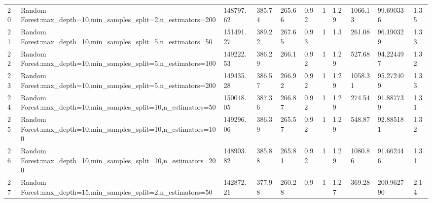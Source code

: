 \begin{longtable}{C{0.8cm} L{2cm} C{1.15cm} C{1.15cm} C{1.15cm} C{1.15cm} C{0.85cm} C{1.25cm} C{1.2cm} C{1.5cm} C{1.0cm}}
20 & Random Forest:\newline max\_depth=10,\newline min\_samples\_split=2,\newline n\_estimators=200 & 148797.62 & 385.74 & 265.66 & 0.92 & 1 & 1.29 & 1066.13 & 99.690336 & 1.35 \\
21 & Random Forest:\newline max\_depth=10,\newline min\_samples\_split=5,\newline n\_estimators=50 & 151491.27 & 389.22 & 267.65 & 0.93 & 1 & 1.3 & 261.08 & 96.190329 & 1.33 \\
22 & Random Forest:\newline max\_depth=10,\newline min\_samples\_split=5,\newline n\_estimators=100 & 149222.53 & 386.29 & 266.1 & 0.92 & 1 & 1.29 & 527.68 & 94.224497 & 1.32 \\
23 & Random Forest:\newline max\_depth=10,\newline min\_samples\_split=5,\newline n\_estimators=200 & 149435.28 & 386.57 & 266.92 & 0.92 & 1 & 1.29 & 1058.31 & 95.272409 & 1.33 \\
24 & Random Forest:\newline max\_depth=10,\newline min\_samples\_split=10,\newline n\_estimators=50 & 150048.05 & 387.36 & 266.87 & 0.92 & 1 & 1.29 & 274.54 & 91.887739 & 1.31 \\
25 & Random Forest:\newline max\_depth=10,\newline min\_samples\_split=10,\newline n\_estimators=100 & 149296.06 & 386.39 & 265.57 & 0.92 & 1 & 1.29 & 548.87 & 92.885181 & 1.32 \\
26 & Random Forest:\newline max\_depth=10,\newline min\_samples\_split=10,\newline n\_estimators=200 & 148903.82 & 385.88 & 265.81 & 0.92 & 1 & 1.29 & 1080.86 & 91.662446 & 1.31 \\
27 & Random Forest:\newline max\_depth=15,\newline min\_samples\_split=2,\newline n\_estimators=50 & 142872.21 & 377.98 & 260.28 & 0.9 & 1 & 1.27 & 369.28 & 200.962790 & 2.14 \\

\end{longtable}
